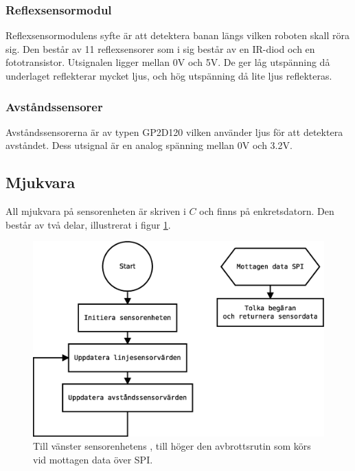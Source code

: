 \subsubsection{Reflexsensormodul}

Reflexsensormodulens syfte är att detektera banan längs vilken roboten skall röra sig. Den består av 11 reflexsensorer som i sig består av en IR-diod och en fototransistor. Utsignalen ligger mellan 0V och 5V. De ger låg utspänning då underlaget reflekterar mycket ljus, och hög utspänning då lite ljus reflekteras.

\subsubsection{Avståndssensorer}

Avståndssensorerna är av typen GP2D120 vilken använder ljus för att detektera avståndet. Dess utsignal är en analog spänning mellan 0V och 3.2V.

\subsection{Mjukvara}

All mjukvara på sensorenheten är skriven i $C$ och finns på enkretsdatorn. Den består av två delar, illustrerat i figur \ref{sensorenhet-mjukvara}.

\begin{figure}[h!]
	\centering
	\includegraphics[scale=0.4]{grafik/sensorenhet-mjukvara}
	\caption{Till vänster sensorenhetens , till höger den avbrottsrutin som körs vid mottagen data över SPI.} \label{sensorenhet-mjukvara}
\end{figure}

